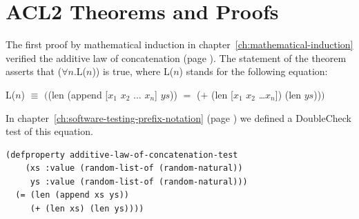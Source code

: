\section{ACL2 Theorems and Proofs}
\label{sec:theorems-and-acl2-proofs}

The first proof by mathematical induction
in chapter~\ref{ch:mathematical-induction}
verified the additive law of concatenation
(page \pageref{additive-law-concatenation}).
The statement of the theorem asserts that ($\forall$$n$.L($n$)) is true,
where L($n$) stands for the following equation:
\label{eq:Ln-additive-law}
\begin{center}
L($n$) $\equiv$ $($\textsf{(len (append [$x_1$ $x_2$ $\dots$ $x_n$] $ys$))} $=$
\textsf{($+$ (len [$x_1$ $x_2$ \dots $x_n$]) (len $ys$))}$)$
\end{center}

In chapter~\ref{ch:software-testing-prefix-notation} (page \pageref{additive-lengths-test})
we defined a DoubleCheck test of this equation.

\begin{code}
\begin{verbatim}
(defproperty additive-law-of-concatenation-test
    (xs :value (random-list-of (random-natural))
     ys :value (random-list-of (random-natural)))
  (= (len (append xs ys))
     (+ (len xs) (len ys))))
\end{verbatim}
\end{code}

